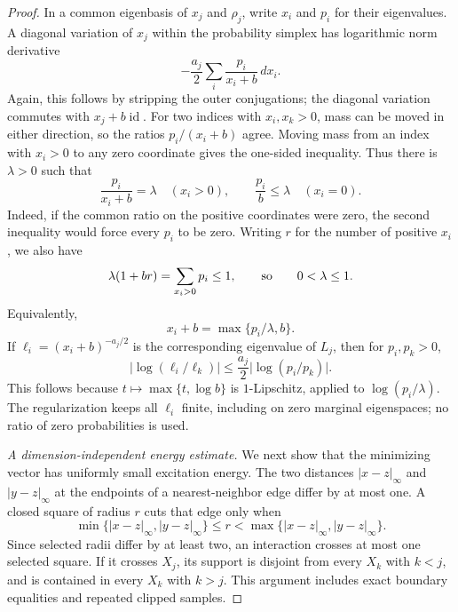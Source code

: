 \documentclass[11pt]{article}
\numberwithin{equation}{section}
\theoremstyle{definition}
\theoremstyle{remark}
\DeclareMathOperator{\id}{id}
\newcommand{\abs}[1]{\lvert #1\rvert}
\begin{document}
\begin{proof}
In a common eigenbasis of \(x_j\) and \(\rho_j\), write \(x_i\)
and \(p_i\) for their eigenvalues.  A diagonal variation of \(x_j\)
within the probability simplex has logarithmic norm derivative
\begin{equation}
 -\frac{a_j}{2}\sum_i \frac{p_i}{x_i+b}\,dx_i.
 \label{eq:patch-simplex-derivative}
\end{equation}
Again, this follows by stripping the outer conjugations; the
diagonal variation commutes with \(x_j+b\id\).
For two indices with \(x_i,x_k>0\), mass can be moved in either
direction, so the ratios \(p_i/(x_i+b)\) agree.  Moving mass from
an index with \(x_i>0\) to any zero coordinate gives the one-sided
inequality.  Thus there is \(\lambda>0\) such that
\begin{equation}
 \frac{p_i}{x_i+b}=\lambda\quad(x_i>0),
 \qquad
 \frac{p_i}{b}\leq\lambda\quad(x_i=0).
 \label{eq:patch-kkt}
\end{equation}
Indeed, if the common ratio on the positive coordinates were zero,
the second inequality would force every \(p_i\) to be zero.
Writing \(r\) for the number of positive \(x_i\), we also have
\[
 \lambda(1+br)=\sum_{x_i>0}p_i\leq1,
 \qquad\hbox{so}\qquad 0<\lambda\leq1.
\]
Equivalently,
\begin{equation}
 x_i+b=\max\{p_i/\lambda,b\}.
 \label{eq:patch-clipped-eigenvalues}
\end{equation}
If \(\ell_i=(x_i+b)^{-a_j/2}\) is the corresponding eigenvalue
of \(L_j\), then for \(p_i,p_k>0\),
\begin{equation}
 \abs{\log(\ell_i/\ell_k)}
 \leq \frac{a_j}{2}\abs{\log(p_i/p_k)} .
 \label{eq:patch-log-ratio}
\end{equation}
This follows because \(t\mapsto\max\{t,\log b\}\) is
\(1\)-Lipschitz, applied to \(\log(p_i/\lambda)\).
The regularization keeps all \(\ell_i\) finite, including on zero
marginal eigenspaces; no ratio of zero probabilities is used.

\emph{A dimension-independent energy estimate.}
We next show that the minimizing vector has uniformly small
excitation energy.  The two distances
\(\abs{x-z}_\infty\) and \(\abs{y-z}_\infty\) at the endpoints
of a nearest-neighbor edge differ by at most one.  A closed square
of radius \(r\) cuts that edge only when
\[
 \min\{\abs{x-z}_\infty,\abs{y-z}_\infty\}
       \leq r
       <\max\{\abs{x-z}_\infty,\abs{y-z}_\infty\}.
\]
Since selected radii differ by at least two, an interaction crosses
at most one selected square.  If it crosses \(X_j\), its support
is disjoint from every \(X_k\) with \(k<j\), and is contained in
every \(X_k\) with \(k>j\).  This argument includes exact boundary
equalities and repeated clipped samples.


\end{proof}
\end{document}
